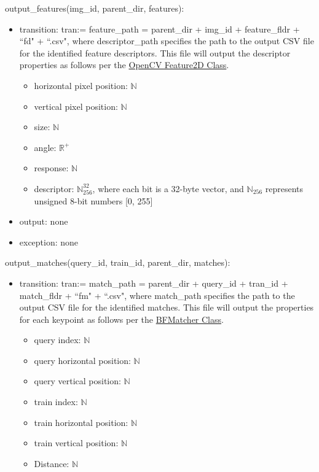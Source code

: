 \documentclass[12pt, titlepage]{article}
\begin{document}
  
  \noindent output\_features(img\_id, parent\_dir, features):
  \begin{itemize}
    \item transition: tran:= feature\_path = parent\_dir + img\_id + feature\_fldr + ``fd" + ``.csv", where descriptor\_path specifies the 
    path to the output CSV file for the identified feature descriptors. This file will output the descriptor properties 
    as follows per the \href{https://docs.opencv.org/4.x/d0/d13/classcv_1_1Feature2D.html}{OpenCV Feature2D Class}.
    \begin{itemize}
      \item horizontal pixel position: $\mathbb{N}$
      \item vertical pixel position: $\mathbb{N}$
      \item size: $\mathbb{N}$
      \item angle: $\mathbb{R}^{+}$
      \item response: $\mathbb{N}$
      \item descriptor: $\mathbb{N}_{256}^{32}$, where each bit is a 32-byte vector, and 
      $\mathbb{N}_{256}$ represents unsigned 8-bit numbers [0, 255]
    \end{itemize}
  \item output: none 
  \item exception: none 
  \end{itemize}
  
  
  \noindent output\_matches(query\_id, train\_id, parent\_dir, matches):
  \begin{itemize}
    \item transition: tran:= match\_path = parent\_dir + query\_id + tran\_id + match\_fldr + ``fm" + ``.csv", where match\_path specifies the 
    path to the output CSV file for the identified matches. This file will output the properties for each keypoint as follows 
    per the \href{https://docs.opencv.org/3.4/d3/da1/classcv_1_1BFMatcher.html}{BFMatcher Class}.
    \begin{itemize}
      \item query index: $\mathbb{N}$
      \item query horizontal position: $\mathbb{N}$
      \item query vertical position: $\mathbb{N}$
      \item train index: $\mathbb{N}$
      \item train horizontal position: $\mathbb{N}$
      \item train vertical position: $\mathbb{N}$
      \item Distance: $\mathbb{N}$
    \end{itemize}
  \end{itemize}
\end{document}
